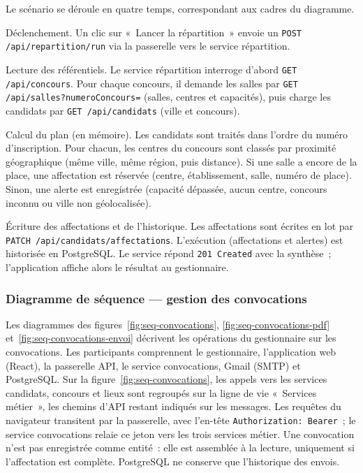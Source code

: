 \begin{onehalfspace}
Le scénario se déroule en quatre temps, correspondant aux cadres du diagramme.

Déclenchement. Un clic sur «~Lancer la répartition~» envoie un \texttt{POST /api/repartition/run} via la passerelle vers le service répartition.

Lecture des référentiels. Le service répartition interroge d'abord \texttt{GET /api/concours}. Pour chaque concours, il demande les salles par \texttt{GET /api/salles?numeroConcours=} (salles, centres et capacités), puis charge les candidats par \texttt{GET /api/candidats} (ville et concours).

Calcul du plan (en mémoire). Les candidats sont traités dans l'ordre du numéro d'inscription. Pour chacun, les centres du concours sont classés par proximité géographique (même ville, même région, puis distance). Si une salle a encore de la place, une affectation est réservée (centre, établissement, salle, numéro de place). Sinon, une alerte est enregistrée (capacité dépassée, aucun centre, concours inconnu ou ville non géolocalisée).

Écriture des affectations et de l'historique. Les affectations sont écrites en lot par \texttt{PATCH /api/candidats/affectations}. L'exécution (affectations et alertes) est historisée en PostgreSQL. Le service répond \texttt{201 Created} avec la synthèse~; l'application affiche alors le résultat au gestionnaire.

\subsubsection{Diagramme de séquence --- gestion des convocations}

Les diagrammes des figures~\ref{fig:seq-convocations}, \ref{fig:seq-convocations-pdf} et~\ref{fig:seq-convocations-envoi} décrivent les opérations du gestionnaire sur les convocations. Les participants comprennent le gestionnaire, l'application web (React), la passerelle API, le service convocations, Gmail (SMTP) et PostgreSQL. Sur la figure~\ref{fig:seq-convocations}, les appels vers les services candidats, concours et lieux sont regroupés sur la ligne de vie «~Services métier~», les chemins d'API restant indiqués sur les messages. Les requêtes du navigateur transitent par la passerelle, avec l'en-tête \texttt{Authorization: Bearer}~; le service convocations relaie ce jeton vers les trois services métier. Une convocation n'est pas enregistrée comme entité~: elle est assemblée à la lecture, uniquement si l'affectation est complète. PostgreSQL ne conserve que l'historique des envois.


\end{onehalfspace}
